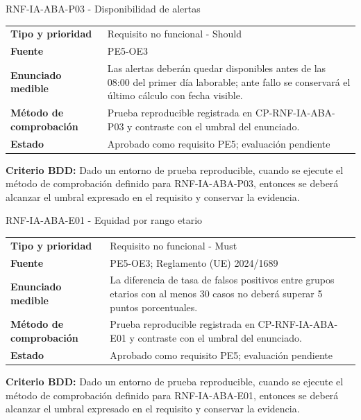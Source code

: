 \documentclass[11pt,a4paper]{article}
\begin{document}
\begin{reqbox}[colframe=Teal]{RNF-IA-ABA-P03 - Disponibilidad de alertas}
\begin{tabularx}{\textwidth}{>{\bfseries}p{3.2cm}Y}
Tipo y prioridad & Requisito no funcional - Should \\
Fuente & PE5-OE3 \\
Enunciado medible & Las alertas deberán quedar disponibles antes de las 08:00 del primer día laborable; ante fallo se conservará el último cálculo con fecha visible. \\
Método de comprobación & Prueba reproducible registrada en CP-RNF-IA-ABA-P03 y contraste con el umbral del enunciado. \\
Estado & Aprobado como requisito PE5; evaluación pendiente \\
\end{tabularx}
\textbf{Criterio BDD:} Dado un entorno de prueba reproducible, cuando se ejecute el método de comprobación definido para RNF-IA-ABA-P03, entonces se deberá alcanzar el umbral expresado en el requisito y conservar la evidencia.
\end{reqbox}


\begin{reqbox}[colframe=Teal]{RNF-IA-ABA-E01 - Equidad por rango etario}
\begin{tabularx}{\textwidth}{>{\bfseries}p{3.2cm}Y}
Tipo y prioridad & Requisito no funcional - Must \\
Fuente & PE5-OE3; Reglamento (UE) 2024/1689 \\
Enunciado medible & La diferencia de tasa de falsos positivos entre grupos etarios con al menos 30 casos no deberá superar 5 puntos porcentuales. \\
Método de comprobación & Prueba reproducible registrada en CP-RNF-IA-ABA-E01 y contraste con el umbral del enunciado. \\
Estado & Aprobado como requisito PE5; evaluación pendiente \\
\end{tabularx}
\textbf{Criterio BDD:} Dado un entorno de prueba reproducible, cuando se ejecute el método de comprobación definido para RNF-IA-ABA-E01, entonces se deberá alcanzar el umbral expresado en el requisito y conservar la evidencia.
\end{reqbox}
\end{document}
